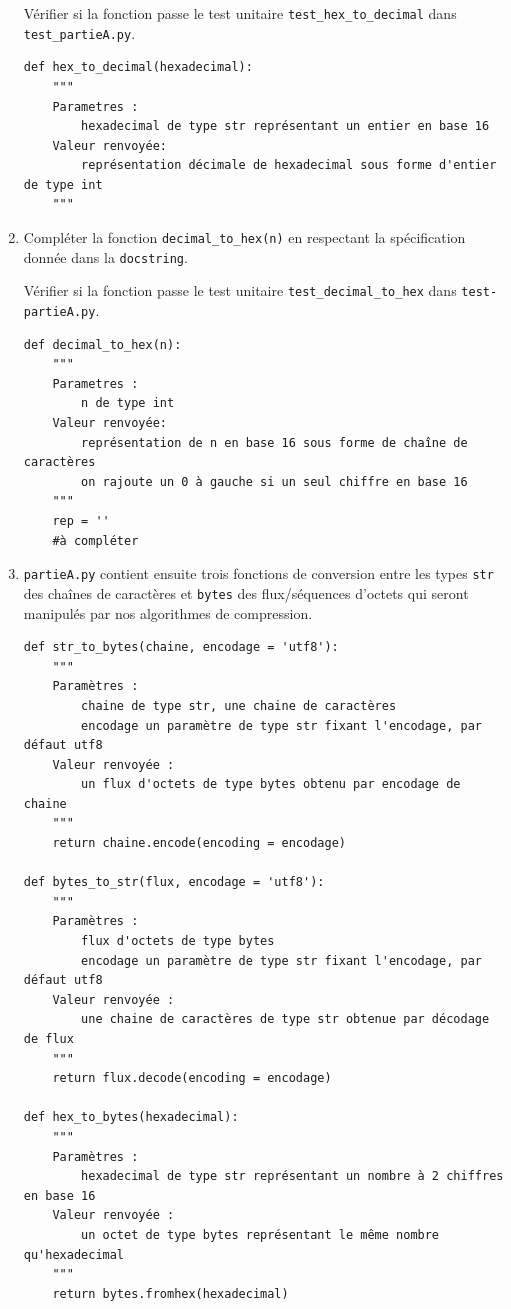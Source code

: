 \documentclass[a4paper, french, 12pt]{article}  %
\newcounter{thme}
\newcounter{def}
\newcounter{alg}
\begin{document}
\begin{enumerate}
Vérifier si la fonction passe le test unitaire \verb+test_hex_to_decimal+ dans \texttt{test\_partieA.py}.

\begin{lstlisting}[style=rond]
def hex_to_decimal(hexadecimal):
    """
    Parametres :
        hexadecimal de type str représentant un entier en base 16
    Valeur renvoyée:
        représentation décimale de hexadecimal sous forme d'entier de type int
    """
\end{lstlisting}


\item Compléter la fonction \verb+decimal_to_hex(n)+ en respectant la spécification donnée dans la \texttt{docstring}. 

Vérifier si la fonction passe le test unitaire \verb+test_decimal_to_hex+ dans \texttt{test-partieA.py}.

\begin{lstlisting}[style=rond]
def decimal_to_hex(n):
    """
    Parametres :
        n de type int
    Valeur renvoyée:
        représentation de n en base 16 sous forme de chaîne de caractères
        on rajoute un 0 à gauche si un seul chiffre en base 16
    """
    rep = ''
    #à compléter 
\end{lstlisting}

\item \texttt{partieA.py} contient ensuite trois fonctions de conversion entre les types \texttt{str} des chaînes de caractères et \texttt{bytes} des flux/séquences d'octets qui seront manipulés par nos algorithmes de compression.

\begin{lstlisting}[style=rond]
def str_to_bytes(chaine, encodage = 'utf8'):
    """
    Paramètres :
        chaine de type str, une chaine de caractères
        encodage un paramètre de type str fixant l'encodage, par défaut utf8
    Valeur renvoyée :
        un flux d'octets de type bytes obtenu par encodage de chaine
    """
    return chaine.encode(encoding = encodage)

def bytes_to_str(flux, encodage = 'utf8'):
    """
    Paramètres :
        flux d'octets de type bytes
        encodage un paramètre de type str fixant l'encodage, par défaut utf8
    Valeur renvoyée :
        une chaine de caractères de type str obtenue par décodage de flux
    """
    return flux.decode(encoding = encodage)

def hex_to_bytes(hexadecimal):
    """
    Paramètres :
        hexadecimal de type str représentant un nombre à 2 chiffres en base 16
    Valeur renvoyée :
        un octet de type bytes représentant le même nombre qu'hexadecimal
    """
    return bytes.fromhex(hexadecimal)
\end{lstlisting}


\end{enumerate}
\end{document}
